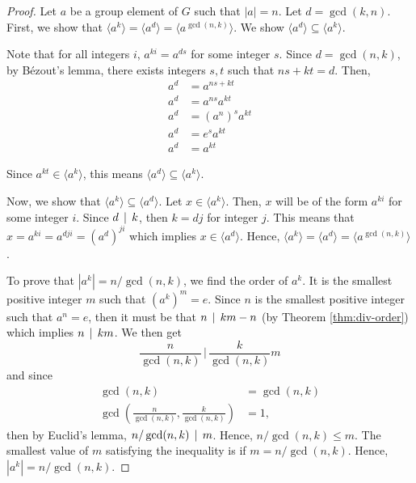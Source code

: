     \begin{proof}
        Let \(a\) be a group element of \(G\) such that \(|a| = n\). Let \(d = \gcd(k, n)\). First, we show that \(\langle a^k\rangle = \langle a^d\rangle = \langle a^{\gcd(n,k)}\rangle\). We show \(\langle a^d\rangle \subseteq \langle a^k \rangle\).

        Note that for all integers \(i\), \(a^{ki} = a^{ds}\) for some integer \(s\). Since \(d = \gcd(n, k)\), by B\'ezout's lemma, there exists integers \(s, t\) such that \(ns + kt = d\). Then,
        \begin{align*}
            a^d &= a^{ns + kt} \\
            a^d &= a^{ns}a^{kt} \\
            a^d &= (a^n)^s a^{kt} \\
            a^d &= e^s a^{kt} \\
            a^d &= a^{kt}
        \end{align*}

        Since \(a^{kt} \in \langle a^k\rangle\), this means \(\langle a^d\rangle \subseteq \langle a^k\rangle\).

        Now, we show that \(\langle a^k\rangle \subseteq \langle a^d\rangle\). Let \(x \in \langle a^k\rangle\). Then, \(x\) will be of the form \(a^{ki}\) for some integer \(i\). Since \(d \,\mid\, k\), then \(k = dj\) for integer \(j\). This means that \(x = a^{ki} = a^{dji} = (a^d)^{ji}\) which implies \(x \in \langle a^{d}\rangle\). Hence, \(\langle a^k\rangle = \langle a^d\rangle = \langle a^{\gcd(n, k)} \rangle\).

        To prove that \(|a^k| = n/\gcd(n, k)\), we find the order of \(a^k\). It is the smallest positive integer \(m\) such that \((a^k)^m = e\). Since \(n\) is the smallest positive integer such that \(a^n = e\), then it must be that \(n \,\mid\, km - n\) (by Theorem \ref{thm:div-order}) which implies \(n \,\mid\, km\). We then get \[\frac{n}{\gcd(n, k)} \,\bigg|\, \frac{k}{\gcd(n, k)}m\] and since
        \begin{align*}
            \gcd(n, k) &= \gcd(n, k) \\
            \gcd\left(\frac{n}{\gcd(n, k)}, \frac{k}{\gcd(n, k)}\right) &= 1,
        \end{align*}
        then by Euclid's lemma, \(n/\gcd(n, k) \,\mid\, m\). Hence, \(n/\gcd(n, k) \leq m\). The smallest value of \(m\) satisfying the inequality is if \(m = n/\gcd(n, k)\). Hence, \(|a^k| = n/\gcd(n, k)\).
    \end{proof}

